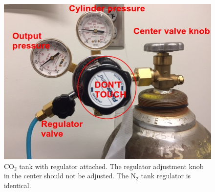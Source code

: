 \documentclass[A4,12pt]{article}
\begin{document}
\begin{figure}
	\center
	\includegraphics[scale=0.5]{co2tank}
	\caption{CO$_2$ tank with regulator attached. The regulator adjustment knob in the center should not be adjusted. The N$_2$ tank regulator is identical.} \label{co2tank}
\end{figure}
\end{document}
